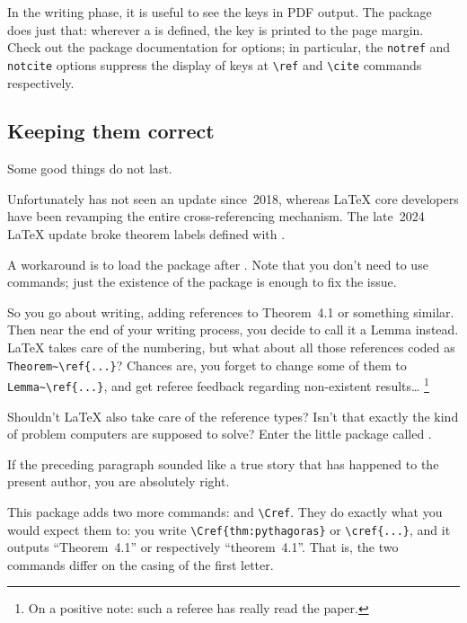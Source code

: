 In the writing phase, it is useful to see the keys in PDF output.
The  package does just that:
wherever a  is defined,
the key is printed to the page margin.
Check out the package documentation for options;
in particular, the \verb|notref| and \verb|notcite| options
suppress the display of keys at \verb|\ref| and \verb|\cite| commands respectively.



%
%
\subsection{Keeping them correct}\label{sec:cleveref}

\begin{warning}
Some good things do not last.

Unfortunately  has not seen an update since~2018,
whereas \LaTeX{} core developers have been revamping the entire cross-referencing mechanism.
The late~2024 \LaTeX{} update broke  theorem labels
defined with .

A workaround is to load the  package after .
Note that you don't need to use  commands;
just the existence of the package is enough to fix the issue.
\end{warning}

So you go about writing, adding references to Theorem~4.1 or something similar.
Then near the end of your writing process,
you decide to call it a Lemma instead.
\LaTeX{} takes care of the numbering,
but what about all those references coded as \verb|Theorem~\ref{...}|?
Chances are, you forget to change some of them to \verb|Lemma~\ref{...}|,
and get referee feedback regarding non-existent results\dots%
\footnote{On a positive note: such a referee has really read the paper.}

Shouldn't \LaTeX{} also take care of the reference types?
Isn't that exactly the kind of problem computers are supposed to solve?
Enter the little package called .

\begin{practices}
If the preceding paragraph sounded like a true story that has happened to the present author,
you are absolutely right.
\end{practices}

This package adds two more commands:  and \verb|\Cref|.
They do exactly what you would expect them to:
you write \verb|\Cref{thm:pythagoras}| or \verb|\cref{...}|,
and it outputs ``Theorem~4.1'' or respectively ``theorem~4.1''.
That is, the two commands differ on the casing of the first letter.

